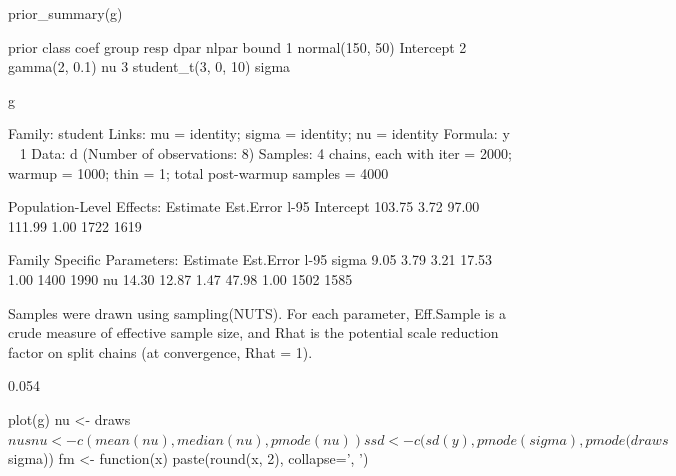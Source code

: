 \begin{Schunk}
\begin{Sinput}
prior_summary(g)
\end{Sinput}
\begin{Soutput}
                prior     class coef group resp dpar nlpar bound
1     normal(150, 50) Intercept                                 
2       gamma(2, 0.1)        nu                                 
3 student_t(3, 0, 10)     sigma                                 
\end{Soutput}
\begin{Sinput}
g
\end{Sinput}
\begin{Soutput}
 Family: student 
  Links: mu = identity; sigma = identity; nu = identity 
Formula: y ~ 1 
   Data: d (Number of observations: 8) 
Samples: 4 chains, each with iter = 2000; warmup = 1000; thin = 1;
         total post-warmup samples = 4000

Population-Level Effects: 
          Estimate Est.Error l-95%
Intercept   103.75      3.72    97.00   111.99 1.00     1722     1619

Family Specific Parameters: 
      Estimate Est.Error l-95%
sigma     9.05      3.79     3.21    17.53 1.00     1400     1990
nu       14.30     12.87     1.47    47.98 1.00     1502     1585

Samples were drawn using sampling(NUTS). For each parameter, Eff.Sample 
is a crude measure of effective sample size, and Rhat is the potential 
scale reduction factor on split chains (at convergence, Rhat = 1).
\end{Soutput}
\begin{Soutput}
[1] 0.054
\end{Soutput}
\begin{Sinput}
plot(g)
nu    <- draws$nu
snu   <- c(mean(nu), median(nu), pmode(nu))
ssd   <- c(sd(y), pmode(sigma), pmode(draws$sigma))
fm    <- function(x) paste(round(x, 2), collapse=', ')
\end{Sinput}
\begin{figure}[htbp]


\end{figure}
\end{Schunk}
